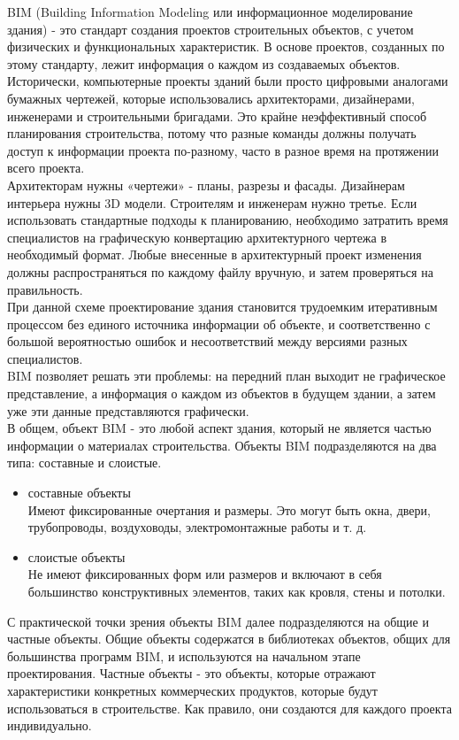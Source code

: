 \documentclass[a4paper,14pt]{extreport} %
\begin{document}
BIM (Building Information Modeling или информационное моделирование здания) - это стандарт создания проектов строительных объектов, с учетом физических и функциональных характеристик. В основе проектов, созданных по этому стандарту, лежит информация о каждом из создаваемых объектов. \\
Исторически, компьютерные проекты зданий были просто цифровыми аналогами бумажных чертежей, которые использовались архитекторами, дизайнерами, инженерами и строительными бригадами. 
Это крайне неэффективный способ планирования строительства, потому что разные команды должны получать доступ к информации проекта по-разному, часто в разное время на протяжении всего проекта. \\
Архитекторам нужны «чертежи» - планы, разрезы и фасады. Дизайнерам интерьера нужны 3D модели. Строителям и инженерам нужно третье. Если использовать стандартные подходы к планированию, необходимо затратить время специалистов на графическую конвертацию архитектурного чертежа в необходимый формат. Любые внесенные в архитектурный проект изменения должны распространяться по каждому файлу вручную, и затем проверяться на правильность. \\
При данной схеме проектирование здания становится трудоемким итеративным процессом без единого источника информации об объекте, и соответственно с большой вероятностью ошибок и несоответствий между версиями разных специалистов. \\
BIM позволяет решать эти проблемы: на передний план выходит не графическое представление, а информация о каждом из объектов в будущем здании, а затем уже эти данные представляются графически. \\
В общем, объект BIM - это любой аспект здания, который не является частью информации о материалах строительства. Объекты BIM подразделяются на два типа: составные и слоистые.
\begin{itemize}
\item составные объекты \\
Имеют фиксированные очертания и размеры. Это могут быть окна, двери, трубопроводы, воздуховоды, электромонтажные работы и т. д.
\item слоистые объекты \\
Не имеют фиксированных форм или размеров и включают в себя большинство конструктивных элементов, таких как кровля, стены и потолки.
\end{itemize}
С практической точки зрения объекты BIM далее подразделяются на общие и частные объекты. Общие объекты содержатся в библиотеках объектов, общих для большинства программ BIM, и используются на начальном этапе проектирования. Частные объекты - это объекты, которые отражают характеристики конкретных коммерческих продуктов, которые будут использоваться в строительстве. Как правило, они создаются для каждого проекта индивидуально. \\
\end{document}
